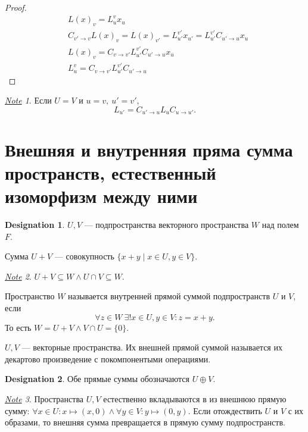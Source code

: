 \documentclass[11pt]{book}
\theoremstyle{definition}
\theoremstyle{plain}
\theoremstyle{plain}
\theoremstyle{definition}
\newtheorem*{name}{Designation}
\theoremstyle{remark}
\newtheorem*{note}{\underline{Note}}
\begin{document}
\begin{proof}
    \begin{align*}
	& L(x)_v = L_u^{v}x_u\\
	& C_{v' \to  v} L(x)_v = L(x)_{v'} = L_{u'}^{v'}x_{u'}=L_{u'}^{v'}C_{u' \to  u} x_u\\
	& L(x)_{v} = C_{v \to  v'}L_{u'}^{v'}C_{u' \to u}x_u\\
	& L_{u}^{v} = C_{v \to v'}L_{u'}^{v'}C_{u' \to u}
    \end{align*}
\end{proof}
\begin{note}
    Если $ U = V$ и  $ u = v, ~ u' = v'$,
    \[
	L_{u'} = C_{u' \to  u} L_u C_{u \to  u'}
    .\]
\end{note}
\section{Внешняя и внутренняя пряма сумма пространств, естественный изоморфизм между ними}
\begin{name}
    $ U, V$ --- подпространства векторного пространства  $ W$ над полем  $ F$.
\end{name}
\begin{defn}
    Сумма $ U + V$ --- совокупность  $ \{x + y \mid x \in U, y \in V\}$.
    \begin{note}
	$ U + V \subseteq W \wedge  U \cap V \subseteq W$.
    \end{note}
\end{defn}
\begin{defn}
    Пространство $ W$ называется {\sf внутренней прямой суммой} подпространств $ U$ и  $ V$, если   $$ \forall z \in W ~ \exists ! x \in U, y \in V: z = x+y.$$ То есть $ W = U + V \wedge V \cap U = \{0\}$.
\end{defn}
\begin{defn}
    $ U, V$ --- векторные пространства.  Их  {\sf внешней прямой суммой} называется их декартово произведение с покомпонентыми операциями.
\end{defn}
\begin{name}
    Обе прямые суммы обозначаются $ U \oplus V$.
\end{name}
\begin{note}
    Пространства $ U, V$ естественно вкладываются в из внешнюю прямую сумму:  $ \forall x \in U: x \mapsto (x, 0) \wedge  \forall y \in V: y \mapsto (0, y)$. Если отождествить $ U$ и  $ V$ с их образами, то внешняя сумма превращается в прямую сумму подпространств.
\end{note}
\end{document}
